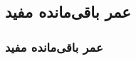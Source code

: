 \documentclass[xcolor=dvipsnames, professionalfonts, aspectratio=169, 11pt]{beamer}
\begin{document}
\begin{persian}
\begin{frame}
%	
%					
%		
%		
%		
%		
%					
	
	
	
\end{frame}











\subsection{عمر باقی‌مانده مفید}
\begin{frame}
	\frametitle{عمر باقی‌مانده مفید}
	

\end{frame}
\end{persian}
\end{document}
